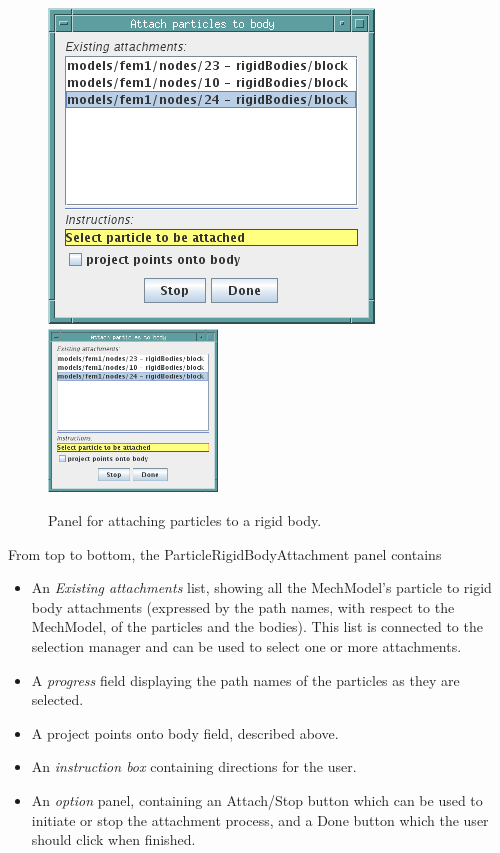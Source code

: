 \documentclass{article}
\begin{document}
\begin{figure}
\begin{center}
\iflatexml
\includegraphics[]{images/attachParticlesToRigidBodyPanel}
\else
\includegraphics[width=0.40\textwidth]{images/attachParticlesToRigidBodyPanel}
\fi
\end{center}
\caption{Panel for attaching particles to a rigid body.}%
\label{attachParticlesToRigidBodyPanelFig}
\end{figure}

From top to bottom, the ParticleRigidBodyAttachment panel contains

\begin{itemize}

\item An {\it Existing attachments} list, showing all the MechModel's particle
to rigid body attachments (expressed by the path names, with respect
to the MechModel, of the particles and the bodies). This list is
connected to the selection manager and can be used to select one or
more attachments.

\item A {\it progress} field displaying the path names of the particles as
they are selected.

\item A {\sf project points onto body} field, described above.

\item An {\it instruction box} containing directions for the user.

\item An {\it option} panel, containing an {\sf Attach/Stop} button 
which can be used
to initiate or stop the attachment process, and a {\sf Done} button which
the user should click when finished.

\end{itemize}
\end{document}

